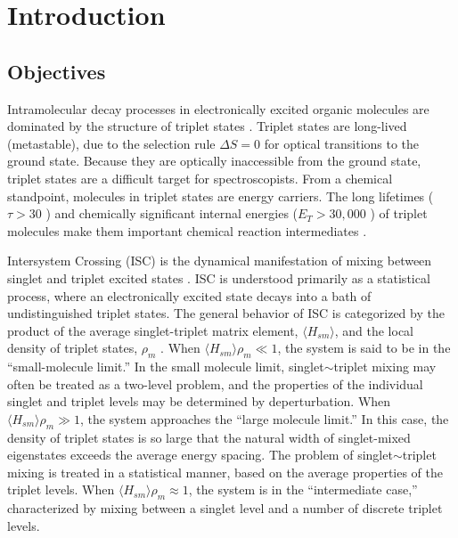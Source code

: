 \documentclass[12pt]{mitthesis}
\begin{document}
\tableofcontents
\clearpage

\chapter{Introduction}
\label{chapter:intro}

\section{Objectives}

Intramolecular decay processes in electronically excited organic
molecules are dominated by the structure of triplet states
\cite{mcglynn69, medvedev95}.  Triplet states are long-lived
(metastable), due to the selection rule $\Delta S = 0$ for optical
transitions to the ground state.  Because they are optically
inaccessible from the ground state, triplet states are a difficult
target for spectroscopists.  From a chemical standpoint, molecules in
triplet states are energy carriers.  The long lifetimes ($\tau > 30$
\microsec) and chemically significant internal energies ($E_T >
30,000$ \rcm) of triplet molecules make them important chemical
reaction intermediates \cite{calvert66}.

Intersystem Crossing (ISC) is the dynamical manifestation of mixing
between singlet and triplet excited states \cite{robinson67,
  kommandeur87, lombardi88, tramer05}.  ISC is understood primarily as
a statistical process, where an electronically excited state decays
into a bath of undistinguished triplet states.  The general behavior
of ISC is categorized by the product of the average singlet-triplet
matrix element, $\langle H_{sm} \rangle$, and the local density of
triplet states, $\rho_m$ \cite{robinson67, kommandeur87, freed76}.  When
$\langle H_{sm} \rangle \rho_m \ll 1$, the system is said to be in the
``small-molecule limit.''  In the small molecule limit,
singlet$\sim$triplet mixing may often be treated as a two-level
problem, and the properties of the individual singlet and triplet
levels may be determined by deperturbation.  When $\langle H_{sm}
\rangle \rho_m \gg 1$, the system approaches the ``large molecule
limit.''  In this case, the density of triplet states is so large that
the natural width of singlet-mixed eigenstates exceeds the average
energy spacing.  The problem of singlet$\sim$triplet mixing is treated
in a statistical manner, based on the average properties of the
triplet levels.  When $\langle H_{sm} \rangle \rho_m \approx 1$, the
system is in the ``intermediate case,'' characterized by mixing
between a singlet level and a number of discrete triplet levels.
\end{document}
